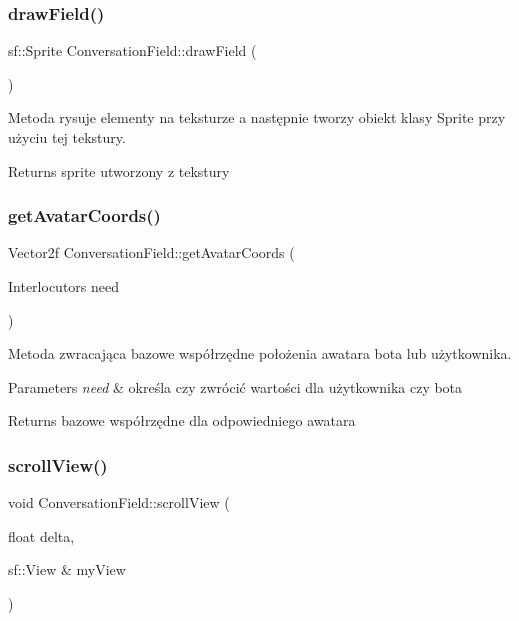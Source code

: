 \subsubsection{\texorpdfstring{drawField()}{drawField()}}
{\footnotesize\ttfamily sf\+::\+Sprite Conversation\+Field\+::draw\+Field (\begin{DoxyParamCaption}{ }\end{DoxyParamCaption})}



Metoda rysuje elementy na teksturze a następnie tworzy obiekt klasy Sprite przy użyciu tej tekstury. 

\begin{DoxyReturn}{Returns}
sprite utworzony z tekstury 
\end{DoxyReturn}
\mbox{\label{class_conversation_field_a32d5743cdda7853889f4fd198c8f8c55}} 
\subsubsection{\texorpdfstring{getAvatarCoords()}{getAvatarCoords()}}
{\footnotesize\ttfamily Vector2f Conversation\+Field\+::get\+Avatar\+Coords (\begin{DoxyParamCaption}\item[{Interlocutors}]{need }\end{DoxyParamCaption})}



Metoda zwracająca bazowe współrzędne położenia awatara bota lub użytkownika. 


\begin{DoxyParams}{Parameters}
{\em need} & określa czy zwrócić wartości dla użytkownika czy bota \\
\hline
\end{DoxyParams}
\begin{DoxyReturn}{Returns}
bazowe współrzędne dla odpowiedniego awatara 
\end{DoxyReturn}
\mbox{\label{class_conversation_field_a562947edbd37166d1a224cb3a92692ea}} 
\subsubsection{\texorpdfstring{scrollView()}{scrollView()}}
{\footnotesize\ttfamily void Conversation\+Field\+::scroll\+View (\begin{DoxyParamCaption}\item[{float}]{delta,  }\item[{sf\+::\+View \&}]{my\+View }\end{DoxyParamCaption})}



